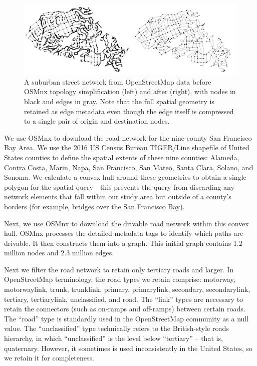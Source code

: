\begin{figure}[htbp]
    \center
    \includegraphics[width=\textwidth]
    {graphics/simplification_before_after.png}
    \caption{A suburban street network from OpenStreetMap data before OSMnx topology simplification (left) and after (right), with nodes in black and edges in gray. Note that the full spatial geometry is retained as edge metadata even though the edge itself is compressed to a single pair of origin and destination nodes.}
    \label{fig:simplification_before_after}
\end{figure}

We use OSMnx to download the road network for the nine-county San Francisco Bay Area. We use the 2016 US Census Bureau TIGER/Line shapefile of United States counties to define the spatial extents of these nine counties: Alameda, Contra Costa, Marin, Napa, San Francisco, San Mateo, Santa Clara, Solano, and Sonoma. We calculate a convex hull around these geometries to obtain a single polygon for the spatial query---this prevents the query from discarding any network elements that fall within our study area but outside of a county's borders (for example, bridges over the San Francisco Bay).

Next, we use OSMnx to download the drivable road network within this convex hull. OSMnx processes the detailed metadata tags to identify which paths are drivable. It then constructs them into a graph. This initial graph contains 1.2 million nodes and 2.3 million edges.

Next we filter the road network to retain only tertiary roads and larger. In OpenStreetMap terminology, the road types we retain comprise: motorway, motorway\textunderscore link, trunk, trunk\textunderscore link, primary, primary\textunderscore link, secondary, secondary\textunderscore link, tertiary, tertiary\textunderscore link, unclassified, and road. The \enquote{link} types are necessary to retain the connectors (such as on-ramps and off-ramps) between certain roads. The \enquote{road} type is standardly used in the OpenStreetMap community as a null value. The \enquote{unclassified} type technically refers to the British-style roads hierarchy, in which \enquote{unclassified} is the level below \enquote{tertiary} – that is, quaternary. However, it sometimes is used inconsistently in the United States, so we retain it for completeness.


